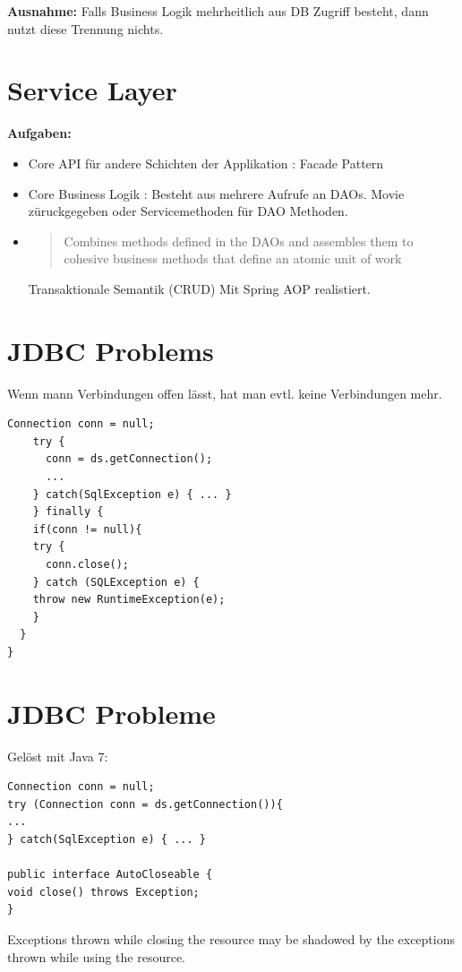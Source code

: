 \documentclass[a4paper,10pt]{scrreprt}
\begin{document}
\textbf{Ausnahme:} Falls Business Logik mehrheitlich aus DB Zugriff besteht, dann nutzt diese Trennung nichts.

\section{Service Layer}
\textbf{Aufgaben:}
\begin{itemize}
 \item Core API für andere Schichten der Applikation : Facade Pattern
 \item Core Business Logik : Besteht aus mehrere Aufrufe an DAOs.
 \subitem Movie züruckgegeben oder Servicemethoden für DAO Methoden.
 \item \begin{quotation}
          Combines methods defined in the DAOs and assembles them to
	  cohesive business methods that define an atomic unit of work
 
       \end{quotation}
\subitem Transaktionale Semantik (CRUD)
\subitem Mit Spring AOP realistiert.
\end{itemize}

\section{JDBC Problems}
Wenn mann Verbindungen offen lässt, hat man evtl. keine Verbindungen mehr.
\begin{lstlisting}[caption=Verbindung offen Beispiel : JDBC]
Connection conn = null;
    try {
      conn = ds.getConnection();
      ...
    } catch(SqlException e) { ... }
    } finally {
    if(conn != null){
    try {
      conn.close();
    } catch (SQLException e) {
    throw new RuntimeException(e);
    }
  }
}
\end{lstlisting}

\section{JDBC Probleme}
Gelöst mit Java 7:
\begin{lstlisting}[caption=Java7 JDBC solution]
 Connection conn = null;
try (Connection conn = ds.getConnection()){
...
} catch(SqlException e) { ... }

public interface AutoCloseable {
void close() throws Exception;
}
\end{lstlisting}

Exceptions thrown while closing the resource may be shadowed by the
exceptions thrown while using the resource.
\end{document}
